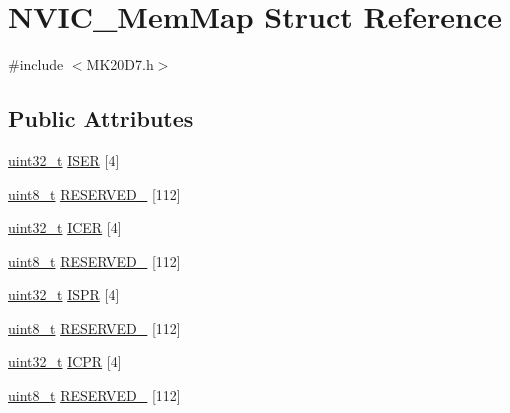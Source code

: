 \hypertarget{struct_n_v_i_c___mem_map}{}\section{N\+V\+I\+C\+\_\+\+Mem\+Map Struct Reference}
\label{struct_n_v_i_c___mem_map}


{\ttfamily \#include $<$M\+K20\+D7.\+h$>$}

\subsection*{Public Attributes}
\begin{DoxyCompactItemize}
\item 
\hyperlink{_p_e___types_8h_a33594304e786b158f3fb30289278f5af}{uint32\+\_\+t} \hyperlink{struct_n_v_i_c___mem_map_a4cfa36b02c8364f60adb7767ee8753fd}{I\+S\+ER} \mbox{[}4\mbox{]}
\item 
\hyperlink{_p_e___types_8h_aba7bc1797add20fe3efdf37ced1182c5}{uint8\+\_\+t} \hyperlink{struct_n_v_i_c___mem_map_a3d561c222264315032b893df6557d2b4}{R\+E\+S\+E\+R\+V\+E\+D\+\_} \mbox{[}112\mbox{]}
\item 
\hyperlink{_p_e___types_8h_a33594304e786b158f3fb30289278f5af}{uint32\+\_\+t} \hyperlink{struct_n_v_i_c___mem_map_adf6a31dee8a4805e4ed8d0ad170e6119}{I\+C\+ER} \mbox{[}4\mbox{]}
\item 
\hyperlink{_p_e___types_8h_aba7bc1797add20fe3efdf37ced1182c5}{uint8\+\_\+t} \hyperlink{struct_n_v_i_c___mem_map_af007c18f796c113d7e1294bcb4c612b0}{R\+E\+S\+E\+R\+V\+E\+D\+\_} \mbox{[}112\mbox{]}
\item 
\hyperlink{_p_e___types_8h_a33594304e786b158f3fb30289278f5af}{uint32\+\_\+t} \hyperlink{struct_n_v_i_c___mem_map_a932539bc859aba0683074746faf980f6}{I\+S\+PR} \mbox{[}4\mbox{]}
\item 
\hyperlink{_p_e___types_8h_aba7bc1797add20fe3efdf37ced1182c5}{uint8\+\_\+t} \hyperlink{struct_n_v_i_c___mem_map_a229dde45f0cce18ea2ccd27239bea315}{R\+E\+S\+E\+R\+V\+E\+D\+\_} \mbox{[}112\mbox{]}
\item 
\hyperlink{_p_e___types_8h_a33594304e786b158f3fb30289278f5af}{uint32\+\_\+t} \hyperlink{struct_n_v_i_c___mem_map_a279595dd8a9e560f6e4e8948a2e52a97}{I\+C\+PR} \mbox{[}4\mbox{]}
\item 
\hyperlink{_p_e___types_8h_aba7bc1797add20fe3efdf37ced1182c5}{uint8\+\_\+t} \hyperlink{struct_n_v_i_c___mem_map_aaa579bd3be44a7299579cf74cf92f488}{R\+E\+S\+E\+R\+V\+E\+D\+\_} \mbox{[}112\mbox{]}

\end{DoxyCompactItemize}
